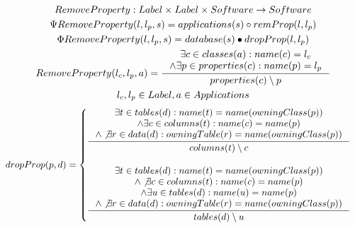 \documentclass[11pt]{article}
\begin{document}
\begin{gather*}
RemoveProperty: Label \times Label \times Software \rightarrow Software \\
\Psi RemoveProperty(l, l_p, s) =  applications(s) \circ  remProp(l, l_p) \\
\Phi RemoveProperty(l, l_p, s) =  database(s) \bullet dropProp(l, l_p) \\
RemoveProperty(l_c, l_p, a) = \inference{\exists c \in classes(a) : name(c) = l_c \\ \wedge \exists p \in properties(c) : name(p) = l_p}{properties(c) \setminus p }\\
l_c, l_p \in Label, a \in Applications 
\end{gather*}
\begin{gather*}
dropProp(p, d) = \begin{cases}
 \inference{ \exists t \in tables(d) : name(t) = name(owningClass(p)) \\ \wedge \exists c \in columns(t) : name(c) = name(p) \\ \wedge \not \exists r \in data(d) : owningTable(r) = name(owningClass(p)) }{columns(t) \setminus c
} \\ \\
  \inference{ \exists t \in tables(d) : name(t) = name(owningClass(p)) \\ \wedge \not \exists c \in columns(t) : name(c) = name(p) \\ \wedge \exists u \in tables(d) : name(u) = name(p) \\ \wedge \not \exists r \in data(d) : owningTable(r) = name(owningClass(p))}{ tables(d) \setminus u }
 \end{cases}
\end{gather*}
\end{document}
